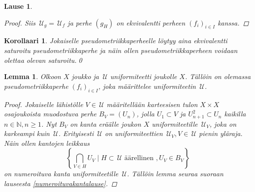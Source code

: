 \documentclass[12pt,a4paper,leqno]{report}
\newcommand{\N}{\mathbb{N}}
\newcommand{\U}{\,\mathcal{U}}
\theoremstyle{plain}
\newtheorem{lause}[equation]{Lause}
\newtheorem{lem}[equation]{Lemma}
\newtheorem{kor}[equation]{Korollaari}
\theoremstyle{definition}
\theoremstyle{remark}
\begin{document}
\begin{lause}
\begin{proof}
Siis $\U_g= \U_f$ ja perhe $(g_H)$ on ekvivalentti perheen $(f_i)_{i\in I}$ kanssa.
\end{proof}
\end{lause}
\begin{kor}\label{saturoitu oletus}
Jokaiselle pseudometriikkaperheelle löytyy aina ekvivalentti saturoitu pseudometriikkaperhe 
ja näin ollen pseudometriikkaperheen voidaan olettaa olevan saturoitu.\qed
\end{kor}

\begin{lem}\label{pseudo_uniformista}
Olkoon $X$ joukko ja $\U$ uniformiteetti joukolle $X$. 
Tällöin on olemassa pseudometriikkaperhe $(f_i)_{i\in I}$, joka määrittelee uniformiteetin $\U$.
\begin{proof}
Jokaiselle lähistölle $V\in\U$ määritellään karteesisen tulon $X\times X$ osajoukoista muodostuva perhe $B_V=(U_n)$, 
jolla $U_1\subset V$ ja $U_{n+1}^2\subset U_n$ kaikilla $n\in\N, n\geq 1$. 
Nyt $B_V$ on kanta eräälle joukon $X$ uniformiteetille $\U_V$, 
joka on karkeampi kuin $\U$. 
Erityisesti $\U$ on uniformiteettien 
$\U_V,V\in\U$ pienin yläraja. %
Näin ollen kantojen leikkaus
$$\left\{\bigcap_{V\in H}U_V\mid H\subset\U \text{ äärellinen }, U_V\in B_V\right\}$$
on numeroituva kanta uniformiteetille $\U$.
Tällöin lemma seuraa suoraan lauseesta \ref{numeroituvakantalause}.
\end{proof}
\end{lem}
\end{document}
